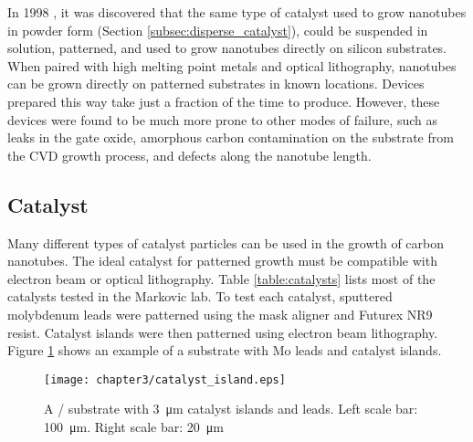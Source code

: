 In 1998 \cite{Kong1998a}, it was discovered that the same type of catalyst used to grow nanotubes in powder form (Section \ref{subsec:disperse_catalyst}), could be suspended in solution, patterned, and used to grow nanotubes directly on silicon substrates. When paired with high melting point metals and optical lithography, nanotubes can be grown directly on patterned substrates in known locations. Devices prepared this way take just a fraction of the time to produce. However, these devices were found to be much more prone to other modes of failure, such as leaks in the gate oxide, amorphous carbon contamination on the substrate from the CVD growth process, and defects along the nanotube length.

\subsection{Catalyst} 

Many different types of catalyst particles can be used in the growth of carbon nanotubes. The ideal catalyst for patterned growth must be compatible with electron beam or optical lithography. Table \ref{table:catalysts} lists most of the catalysts tested in the Markovic lab. To test each catalyst, sputtered molybdenum leads were patterned using the mask aligner and Futurex NR9 resist. Catalyst islands were then patterned using electron beam lithography. Figure \ref{fig:catalyst_islands} shows an example of a substrate with Mo leads and catalyst islands.

\begin{figure}
	\centering
	\texttt{[image: chapter3/catalyst\_island.eps]}
	\caption{A / substrate with \SI{3}{\micro\meter} catalyst islands and  leads. Left scale bar: \SI{100}{\micro\meter}. Right scale bar: \SI{20}{\micro\meter} }
	\label{fig:catalyst_islands}
\end{figure}

